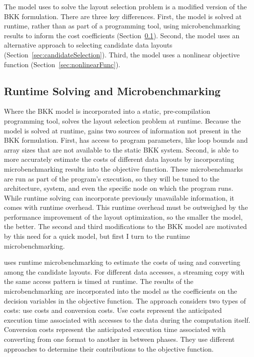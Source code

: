 The model \FormatDecisions{} uses to solve the layout selection problem is a modified version of the BKK formulation.
There are three key differences.
First, the model is solved at runtime, rather than as part of a programming tool, using microbenchmarking results to inform the cost coefficients (Section~\ref{sec:microbenchmarking}).
Second, the model uses an alternative approach to selecting candidate data layouts (Section~\ref{sec:candidateSelection}).
Third, the model uses a nonlinear objective function (Section~\ref{sec:nonlinearFunc}).

\subsection{Runtime Solving and Microbenchmarking}\label{sec:microbenchmarking}

Where the BKK model is incorporated into a static, pre-compilation programming tool, \FormatDecisions{} solves the layout selection problem at runtime.
Because the model is solved at runtime, \FormatDecisions{} gains two sources of information not present in the BKK formulation.
First, \FormatDecisions{} has access to program parameters, like loop bounds and array sizes that are not available to the static BKK system.
Second, \FormatDecisions{} is able to more accurately estimate the costs of different data layouts by incorporating microbenchmarking results into the objective function.
These microbenchmarks are run as part of the program's execution, so they will be tuned to the architecture, system, and even the specific node on which the program runs.
While runtime solving can incorporate previously unavailable information, it comes with runtime overhead.
This runtime overhead must be outweighed by the performance improvement of the layout optimization, so the smaller the model, the better.
The second and third modifications to the BKK model are motivated by this need for a quick model, but first I turn to the runtime microbenchmarking.

\FormatDecisions{} uses runtime microbenchmarking to estimate the costs of using and converting among the candidate layouts. 
For different data accesses, a streaming copy with the same access pattern is timed at runtime.
The results of the microbenchmarking are incorporated into the model as the coefficients on the decision variables in the objective function.
The approach considers two types of costs: use costs and conversion costs.
Use costs represent the anticipated execution time associated with accesses to the data during the computation itself.
Conversion costs represent the anticipated execution time associated with converting from one format to another in between phases.
They use different approaches to determine their contributions to the objective function.

